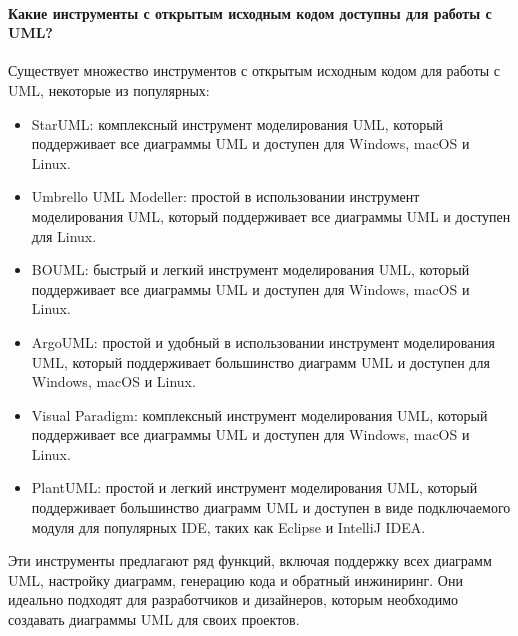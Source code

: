\documentclass[letterpaper,10pt,russian]{sphinxmanual}
\begin{document}
\paragraph{Какие инструменты с открытым исходным кодом доступны для работы с UML?}
\label{\detokenize{educational_materials/uml/content:id19}}
\sphinxAtStartPar
Существует множество инструментов с открытым исходным кодом для работы с UML, некоторые из популярных:
\begin{itemize}
\item {} 
\sphinxAtStartPar
StarUML: комплексный инструмент моделирования UML, который поддерживает все диаграммы UML и доступен для Windows, macOS и Linux.

\item {} 
\sphinxAtStartPar
Umbrello UML Modeller: простой в использовании инструмент моделирования UML, который поддерживает все диаграммы UML и доступен для Linux.

\item {} 
\sphinxAtStartPar
BOUML: быстрый и легкий инструмент моделирования UML, который поддерживает все диаграммы UML и доступен для Windows, macOS и Linux.

\item {} 
\sphinxAtStartPar
ArgoUML: простой и удобный в использовании инструмент моделирования UML, который поддерживает большинство диаграмм UML и доступен для Windows, macOS и Linux.

\item {} 
\sphinxAtStartPar
Visual Paradigm: комплексный инструмент моделирования UML, который поддерживает все диаграммы UML и доступен для Windows, macOS и Linux.

\item {} 
\sphinxAtStartPar
PlantUML: простой и легкий инструмент моделирования UML, который поддерживает большинство диаграмм UML и доступен в виде подключаемого модуля для популярных IDE, таких как Eclipse и IntelliJ IDEA.

\end{itemize}

\sphinxAtStartPar
Эти инструменты предлагают ряд функций, включая поддержку всех диаграмм UML, настройку диаграмм, генерацию кода и обратный инжиниринг. Они идеально подходят для разработчиков и дизайнеров, которым необходимо создавать диаграммы UML для своих проектов.
\end{document}
